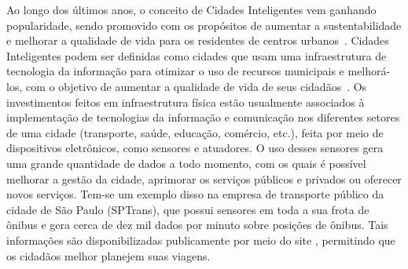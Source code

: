 

Ao longo dos últimos anos, o conceito de Cidades Inteligentes vem ganhando popularidade, sendo promovido com os propósitos de aumentar a sustentabilidade e melhorar a qualidade de vida para os residentes de centros urbanos~\citep{kon2016cidades}. Cidades Inteligentes podem ser definidas como cidades que usam uma infraestrutura de tecnologia da informação para otimizar o uso de recursos municipais e melhorá-los, com o objetivo de aumentar a qualidade de vida de seus cidadãos~\citep{doi:10.1080/10630732.2011.601117}. Os investimentos feitos em infraestrutura física estão usualmente associados à implementação de tecnologias da informação e comunicação nos diferentes setores de uma cidade (transporte, saúde, educação, comércio, etc.), feita por meio de dispositivos eletrônicos, como sensores e atuadores. 
O uso desses sensores gera uma grande quantidade de dados a todo momento, com os quais é possível melhorar a gestão da cidade, aprimorar os serviços públicos e privados ou oferecer novos serviços.
Tem-se um exemplo disso na empresa de transporte público da cidade de São Paulo (SPTrans), que possui sensores em toda a sua frota de ônibus e gera cerca de dez mil dados por minuto sobre posições de ônibus. %
Tais informações são disponibilizadas publicamente por meio do site \cite{Olhovivo}, permitindo que os cidadãos melhor planejem suas viagens.






